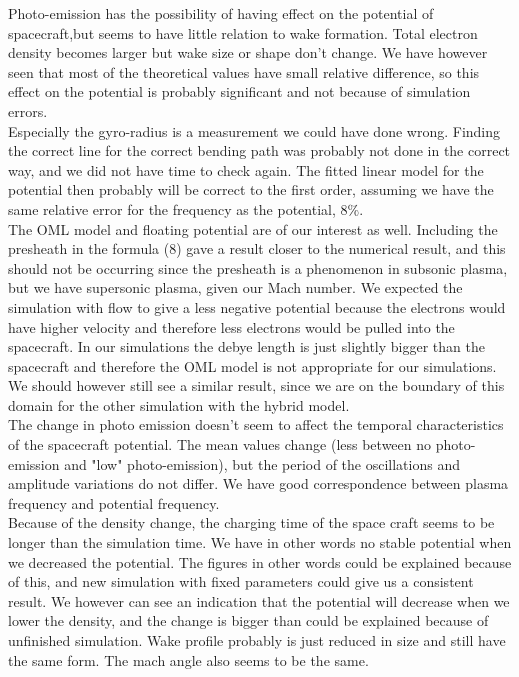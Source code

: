 \documentclass[aip, 
rsi, 
amsmath,
amssymb,
longbibliography,
preprint]{revtex4-1}
\begin{document}
Photo-emission has the possibility of having effect on the potential of spacecraft,but seems to have little relation to wake formation. Total electron density becomes larger but wake size or shape don't change. We have however seen that most of the theoretical values have small relative difference, so this effect on the potential is probably significant and not because of simulation errors.\\

Especially the gyro-radius is a measurement we could have done wrong. Finding the correct line for the correct bending path was probably not done in the correct way, and we did not have time to check again. The fitted linear model for the potential then probably will be correct to the first order, assuming we have the same relative error for the frequency as the potential, $8\%$.\\

The OML model and floating potential are of our interest as well. Including the presheath in the formula (8) gave a result closer to the numerical result, and this should not be occurring since the presheath is a phenomenon in subsonic plasma, but we have supersonic plasma, given our Mach number. We expected the simulation with flow to give a less negative potential because the electrons would have higher velocity and therefore less electrons would be pulled into the spacecraft. In our simulations the debye length is just slightly bigger than the spacecraft and therefore the OML model is not appropriate for our simulations. We should however still see a similar result, since we are on the boundary of this domain for the other simulation with the hybrid model\cite{P7}.\\

The change in photo emission doesn't seem to affect the temporal characteristics of the spacecraft potential. The mean values change (less between no photo-emission and "low" photo-emission), but the period of the oscillations and amplitude variations do not differ. We have good correspondence between plasma frequency and potential frequency.\\

Because of the density change, the charging time of the space craft seems to be longer than the simulation time. We have in other words no stable potential when we decreased the potential. The figures in other words could be explained because of this, and new simulation with fixed parameters could give us a consistent result. We however can see an indication that the potential will decrease when we lower the density, and the change is bigger than could be explained because of unfinished simulation. Wake profile probably is just reduced in size and still have the same form. The mach angle also seems to be the same. 
\end{document}
